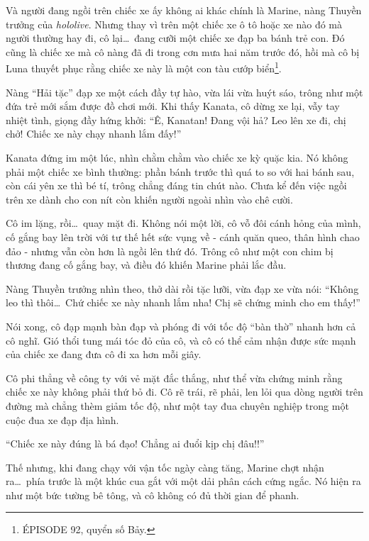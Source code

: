 \documentclass[../main.tex]{subfiles}
\begin{document}
Và người đang ngồi trên chiếc xe ấy không ai khác chính là Marine, nàng Thuyền trưởng của \textit{hololive}. Nhưng thay vì trên một chiếc xe ô tô hoặc xe nào đó mà người thường hay đi, cô lại\dots\ đang cưỡi một chiếc xe đạp ba bánh trẻ con. Đó cũng là chiếc xe mà cô nàng đã đi trong cơn mưa hai năm trước đó, hồi mà cô bị Luna thuyết phục rằng chiếc xe này là một con tàu cướp biển\footnote{{\flaregothic ÉPISODE 92}, quyển số Bảy.}.


Nàng ``Hải tặc'' đạp xe một cách đầy tự hào, vừa lái vừa huýt sáo, trông như một đứa trẻ mới sắm được đồ chơi mới. Khi thấy Kanata, cô dừng xe lại, vẫy tay nhiệt tình, giọng đầy hứng khởi: ``Ê, Kanatan! Đang vội hả? Leo lên xe đi, chị chở! Chiếc xe này chạy nhanh lắm đấy!''

Kanata đứng im một lúc, nhìn chằm chằm vào chiếc xe kỳ quặc kia. Nó không phải một chiếc xe bình thường: phần bánh trước thì quá to so với hai bánh sau, còn cái yên xe thì bé tí, trông chẳng đáng tin chút nào. Chưa kể đến việc ngồi trên xe dành cho con nít còn khiến người ngoài nhìn vào chê cười.

Cô im lặng, rồi\dots\ quay mặt đi. Không nói một lời, cô vỗ đôi cánh hỏng của mình, cố gắng bay lên trời với tư thế hết sức vụng về - cánh quăn queo, thân hình chao đảo - nhưng vẫn còn hơn là ngồi lên thứ đó. Trông cô như một con chim bị thương đang cố gắng bay, và điều đó khiến Marine phải lắc đầu.


Nàng Thuyền trưởng nhìn theo, thở dài rồi tặc lưỡi, vừa đạp xe vừa nói: ``Không leo thì thôi\dots\ Chứ chiếc xe này nhanh lắm nha! Chị sẽ chứng minh cho em thấy!''

Nói xong, cô đạp mạnh bàn đạp và phóng đi với tốc độ ``bàn thờ'' nhanh hơn cả cô nghĩ. Gió thổi tung mái tóc đỏ của cô, và cô có thể cảm nhận được sức mạnh của chiếc xe đang đưa cô đi xa hơn mỗi giây.

Cô phi thẳng về công ty với vẻ mặt đắc thắng, như thể vừa chứng minh rằng chiếc xe này không phải thứ bỏ đi. Cô rẽ trái, rẽ phải, len lỏi qua dòng người trên đường mà chẳng thèm giảm tốc độ, như một tay đua chuyên nghiệp trong một cuộc đua xe đạp địa hình.

``Chiếc xe này đúng là bá đạo! Chẳng ai đuổi kịp chị đâu!!''

Thế nhưng, khi đang chạy với vận tốc ngày càng tăng, Marine chợt nhận ra\dots\ phía trước là một khúc cua gắt với một dải phân cách cứng ngắc. Nó hiện ra như một bức tường bê tông, và cô không có đủ thời gian để phanh.
\end{document}
